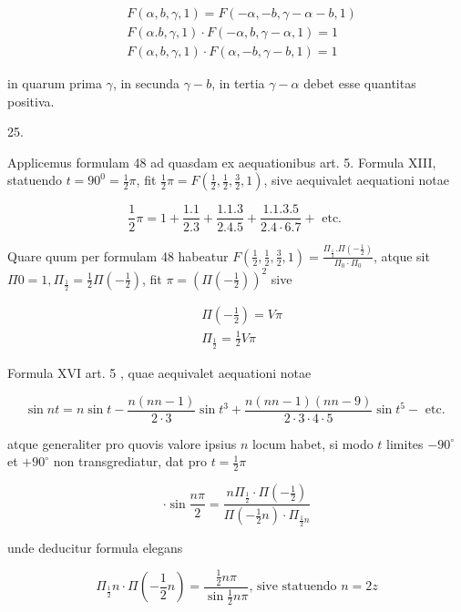 \documentclass[10pt]{article}
\begin{document}
\[
\begin{aligned}
& F(\alpha, b, \gamma, 1)=F(-\alpha,-b, \gamma-\alpha-b, 1) \\
& F(\alpha . b, \gamma, 1) \cdot F(-\alpha, b, \gamma-\alpha, 1)=1 \\
& F(\alpha, b, \gamma, 1) \cdot F(\alpha,-b, \gamma-b, 1)=1
\end{aligned}
\]

in quarum prima \(\gamma\), in secunda \(\gamma-b\), in tertia \(\gamma-\alpha\) debet esse quantitas positiva.

25.

Applicemus formulam 48 ad quasdam ex aequationibus art. 5. Formula XIII, statuendo \(t=90^{0}=\frac{1}{2} \pi\), fit \(\frac{1}{2} \pi=F\left(\frac{1}{2}, \frac{1}{2}, \frac{3}{2}, 1\right)\), sive aequivalet aequationi notae

\[
\frac{1}{2} \pi=1+\frac{1.1}{2.3}+\frac{1.1 .3}{2.4 .5}+\frac{1.1 .3 .5}{2.4 \cdot 6.7}+\text { etc. }
\]

Quare quum per formulam 48 habeatur \(F\left(\frac{1}{2}, \frac{1}{2}, \frac{3}{2}, 1\right)=\frac{\Pi_{\frac{1}{3}} . \Pi\left(-\frac{1}{2}\right)}{\Pi_{0} \cdot \Pi_{0}}\), atque sit \(\Pi 0=1, \Pi_{\frac{1}{2}}=\frac{1}{2} \Pi\left(-\frac{1}{2}\right)\), fit \(\pi=\left(\Pi\left(-\frac{1}{2}\right)\right)^{2}\) sive

\[
\begin{aligned}
& \Pi\left(-\frac{1}{2}\right)=V \pi \\
& \Pi_{\frac{1}{2}}=\frac{1}{2} V \pi
\end{aligned}
\]

Formula XVI art. 5 , quae aequivalet aequationi notae

\[
\sin n t=n \sin t-\frac{n(n n-1)}{2 \cdot 3} \sin t^{3}+\frac{n(n n-1)(n n-9)}{2 \cdot 3 \cdot 4 \cdot 5} \sin t^{5}-\text { etc. }
\]

atque generaliter pro quovis valore ipsius \(n\) locum habet, si modo \(t\) limites \(-90^{\circ}\) et \(+90^{\circ}\) non transgrediatur, dat pro \(t=\frac{1}{2} \pi\)

\[
\cdot \sin \frac{n \pi}{2}=\frac{n \Pi_{\frac{1}{2}} \cdot \Pi\left(-\frac{1}{2}\right)}{\Pi\left(-\frac{1}{2} n\right) \cdot \Pi_{\frac{1}{2} n}}
\]

unde deducitur formula elegans

\[
\Pi_{\frac{1}{2}} n \cdot \Pi\left(-\frac{1}{2} n\right)=\frac{\frac{1}{2} n \pi}{\sin \frac{1}{2} n \pi} \text {, sive statuendo } n=2 z
\]
\end{document}
